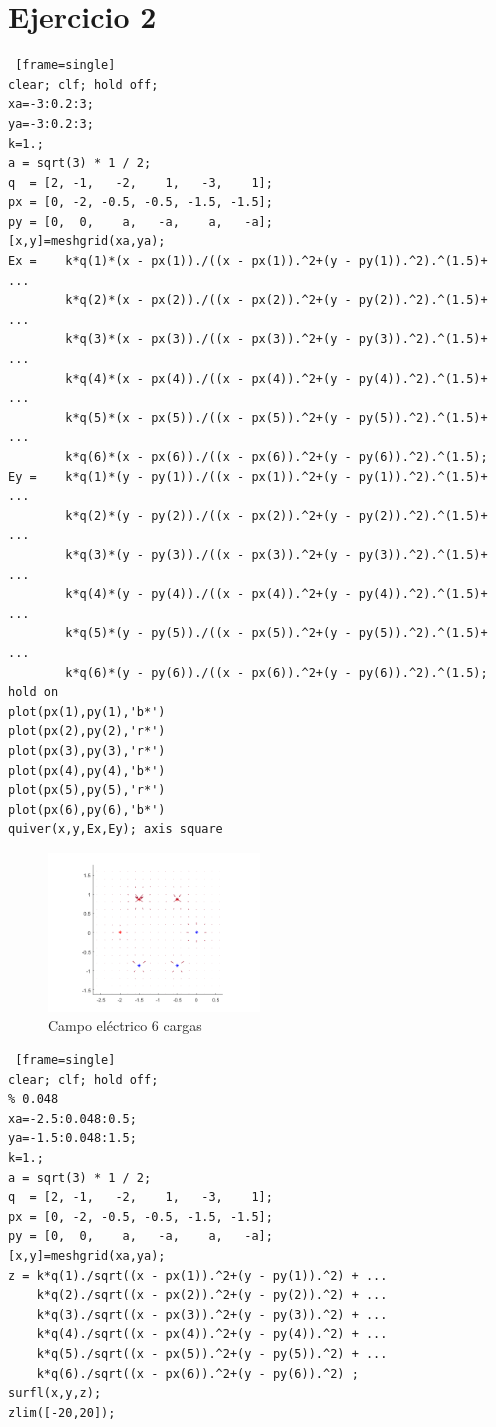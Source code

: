 \documentclass{article}
\begin{document}
\section{Ejercicio 2}

\begin{lstlisting} [frame=single]
clear; clf; hold off;
xa=-3:0.2:3;
ya=-3:0.2:3;
k=1.; 
a = sqrt(3) * 1 / 2;
q  = [2, -1,   -2,    1,   -3,    1];
px = [0, -2, -0.5, -0.5, -1.5, -1.5];
py = [0,  0,    a,   -a,    a,   -a];
[x,y]=meshgrid(xa,ya);
Ex =    k*q(1)*(x - px(1))./((x - px(1)).^2+(y - py(1)).^2).^(1.5)+ ...
        k*q(2)*(x - px(2))./((x - px(2)).^2+(y - py(2)).^2).^(1.5)+ ...
        k*q(3)*(x - px(3))./((x - px(3)).^2+(y - py(3)).^2).^(1.5)+ ...
        k*q(4)*(x - px(4))./((x - px(4)).^2+(y - py(4)).^2).^(1.5)+ ...
        k*q(5)*(x - px(5))./((x - px(5)).^2+(y - py(5)).^2).^(1.5)+ ...
        k*q(6)*(x - px(6))./((x - px(6)).^2+(y - py(6)).^2).^(1.5);
Ey =    k*q(1)*(y - py(1))./((x - px(1)).^2+(y - py(1)).^2).^(1.5)+ ...
        k*q(2)*(y - py(2))./((x - px(2)).^2+(y - py(2)).^2).^(1.5)+ ...
        k*q(3)*(y - py(3))./((x - px(3)).^2+(y - py(3)).^2).^(1.5)+ ...
        k*q(4)*(y - py(4))./((x - px(4)).^2+(y - py(4)).^2).^(1.5)+ ...
        k*q(5)*(y - py(5))./((x - px(5)).^2+(y - py(5)).^2).^(1.5)+ ...
        k*q(6)*(y - py(6))./((x - px(6)).^2+(y - py(6)).^2).^(1.5);
hold on
plot(px(1),py(1),'b*')
plot(px(2),py(2),'r*')
plot(px(3),py(3),'r*')
plot(px(4),py(4),'b*')
plot(px(5),py(5),'r*')
plot(px(6),py(6),'b*')
quiver(x,y,Ex,Ey); axis square
\end{lstlisting}

\begin{figure}[H]
\centering
    \includegraphics[width=0.5\textwidth]{images/002A.png}
    \caption{Campo eléctrico 6 cargas}
\end{figure}

\clearpage
\newpage

\begin{lstlisting} [frame=single]
clear; clf; hold off;
% 0.048
xa=-2.5:0.048:0.5;
ya=-1.5:0.048:1.5;
k=1.; 
a = sqrt(3) * 1 / 2;
q  = [2, -1,   -2,    1,   -3,    1];
px = [0, -2, -0.5, -0.5, -1.5, -1.5];
py = [0,  0,    a,   -a,    a,   -a];
[x,y]=meshgrid(xa,ya);
z = k*q(1)./sqrt((x - px(1)).^2+(y - py(1)).^2) + ...
    k*q(2)./sqrt((x - px(2)).^2+(y - py(2)).^2) + ...
    k*q(3)./sqrt((x - px(3)).^2+(y - py(3)).^2) + ...
    k*q(4)./sqrt((x - px(4)).^2+(y - py(4)).^2) + ...
    k*q(5)./sqrt((x - px(5)).^2+(y - py(5)).^2) + ...
    k*q(6)./sqrt((x - px(6)).^2+(y - py(6)).^2) ;
surfl(x,y,z);
zlim([-20,20]); 
\end{lstlisting}
\end{document}
